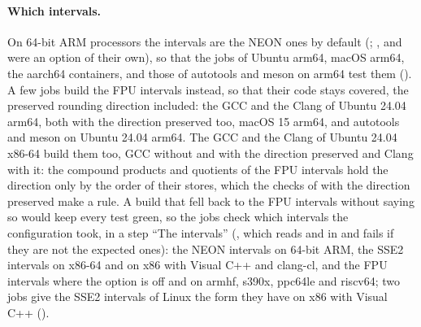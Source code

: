 \documentclass[12pt,a4paper,twoside,openright]{book}
\begin{document}
\paragraph{Which intervals.} On 64-bit ARM processors the intervals are the
NEON ones by default (; ,
 and  were an option of their
own),\newinvfive{} so that the jobs of Ubuntu arm64, macOS arm64, the
aarch64 containers, and those of autotools and meson on arm64 test them
(). A few jobs build the FPU intervals instead, so that
their code stays covered, the preserved rounding direction included: the
GCC and the Clang of Ubuntu 24.04 arm64, both with the direction preserved
too, macOS 15 arm64, and autotools and meson on Ubuntu 24.04 arm64. The GCC
and the Clang of Ubuntu 24.04 x86-64 build them too, GCC without and with
the direction preserved and Clang with it: the compound products and
quotients of the FPU intervals hold the direction only by the order of their
stores, which the checks of  with the direction
preserved make a rule.\newinvfive{} A build that fell back to the FPU
intervals without saying so would keep every test green, so the jobs check
which intervals the configuration took, in a step ``The intervals''
(, which reads
 and
 in
 and
fails if they are not the expected ones): the NEON intervals on 64-bit ARM,
the SSE2 intervals on x86-64 and on x86 with Visual C++ and clang-cl, and
the FPU intervals where the option is off and on armhf, s390x, ppc64le and
riscv64; two jobs give the SSE2 intervals of Linux the form they have on
x86 with Visual C++ ().
\end{document}
